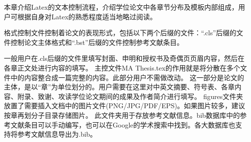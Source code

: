 本章介绍Latex的文本控制流程，介绍学位论文中各章节分布及模板内部组成，用户可根据自身对Latex的熟悉程度适当地略过阅读。\par
{}
格式控制文件控制着论文的表现形式，包括以下两个后缀的文件：“.cls”后缀的文件控制论文主体格式和“.bst”后缀的文件控制参考文献条目。\par
一般用户在.cls后缀的文件里填写封面、申明和授权书及奇偶页页眉内容，然后在各章正文处进行内容的填写。
主控文件MA Thesis.tex的作用就是将分散在多个文件中的内容整合成一篇完整的内容。此部分用户不需做改动。
这一部分是论文的主体，是以“章”为单位划分的。用户需要在这里对中英文摘要、符号表、各章内容、附录、致谢、攻读学位论文期间的成果及作者简介进行填写。
figures文件夹放置了需要插入文档中的图片文件(PNG/JPG/PDF/EPS)。如果图片较多，建议按章再划分子目录存储图片。
此文件夹用于存放参考文献信息。bib数据库中的参考文献条目可以手动编写，也可以在Google的学术搜索中找到。各大数据库也支持将参考文献信息导出为.bib。



